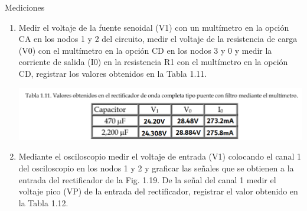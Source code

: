 \documentclass[12pt]{article}
\begin{document}
\begin{enumerate}
\begin{center}
            \end{center}
            Mediciones\par
            \begin{enumerate}
                \item Medir el voltaje de la fuente senoidal (V1) con un multímetro en la opción CA en los nodos
                1 y 2 del circuito, medir el voltaje de la resistencia de carga (V0) con el multímetro en la
                opción CD en los nodos 3 y 0 y medir la corriente de salida (I0) en la resistencia R1 con el
                multímetro en la opción CD, registrar los valores obtenidos en la Tabla 1.11.
            
                \begin{center}
                    \includegraphics*[scale=0.6]{tabla1-11.png}
                \end{center}
                \item Mediante el osciloscopio medir el voltaje de entrada (V1) colocando el canal 1 del
                osciloscopio en los nodos 1 y 2 y graficar las señales que se obtienen a la entrada del
                rectificador de la Fig. 1.19. De la señal del canal 1 medir el voltaje pico (VP) de la entrada
                del rectificador, registrar el valor obtenido en la Tabla 1.12.
                

\end{enumerate}
\end{enumerate}
\end{document}
